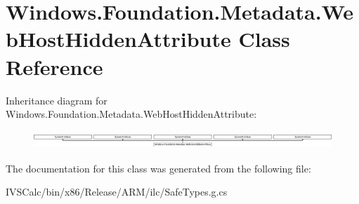 \hypertarget{class_windows_1_1_foundation_1_1_metadata_1_1_web_host_hidden_attribute}{}\section{Windows.\+Foundation.\+Metadata.\+Web\+Host\+Hidden\+Attribute Class Reference}
\label{class_windows_1_1_foundation_1_1_metadata_1_1_web_host_hidden_attribute}
Inheritance diagram for Windows.\+Foundation.\+Metadata.\+Web\+Host\+Hidden\+Attribute\+:\begin{figure}[H]
\begin{center}
\leavevmode
\includegraphics[height=0.670659cm]{class_windows_1_1_foundation_1_1_metadata_1_1_web_host_hidden_attribute}
\end{center}
\end{figure}


The documentation for this class was generated from the following file\+:\begin{DoxyCompactItemize}
\item 
I\+V\+S\+Calc/bin/x86/\+Release/\+A\+R\+M/ilc/Safe\+Types.\+g.\+cs\end{DoxyCompactItemize}
